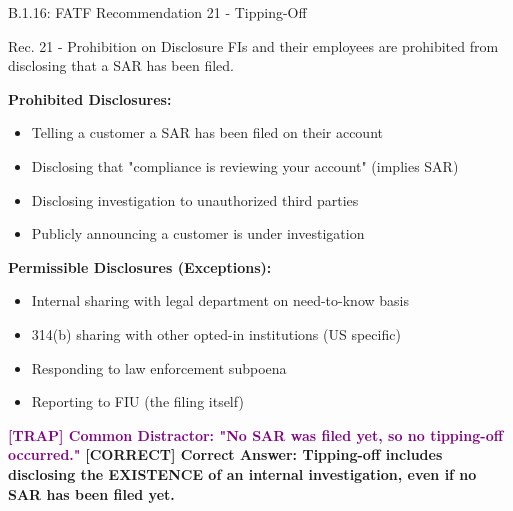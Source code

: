 \documentclass[11pt,a4paper]{beamer}
\newcommand{\trap}[1]{\textcolor{purple}{\textbf{[TRAP] #1}}}
\newcommand{\correct}[1]{\textcolor{green!50!black}{\textbf{[CORRECT] #1}}}
\begin{document}
	\begin{frame}{B.1.16: FATF Recommendation 21 - Tipping-Off}
		\begin{block}{Rec. 21 - Prohibition on Disclosure}
			FIs and their employees are prohibited from disclosing that a SAR has been filed.
		\end{block}
		\textbf{Prohibited Disclosures:}
		\begin{itemize}
			\item Telling a customer a SAR has been filed on their account
			\item Disclosing that "compliance is reviewing your account" (implies SAR)
			\item Disclosing investigation to unauthorized third parties
			\item Publicly announcing a customer is under investigation
		\end{itemize}
		\textbf{Permissible Disclosures (Exceptions):}
		\begin{itemize}
			\item Internal sharing with legal department on need-to-know basis
			\item 314(b) sharing with other opted-in institutions (US specific)
			\item Responding to law enforcement subpoena
			\item Reporting to FIU (the filing itself)
		\end{itemize}
		\trap{Common Distractor: "No SAR was filed yet, so no tipping-off occurred."}
		\correct{Correct Answer: Tipping-off includes disclosing the EXISTENCE of an internal investigation, even if no SAR has been filed yet.}
	\end{frame}
	
\end{document}

